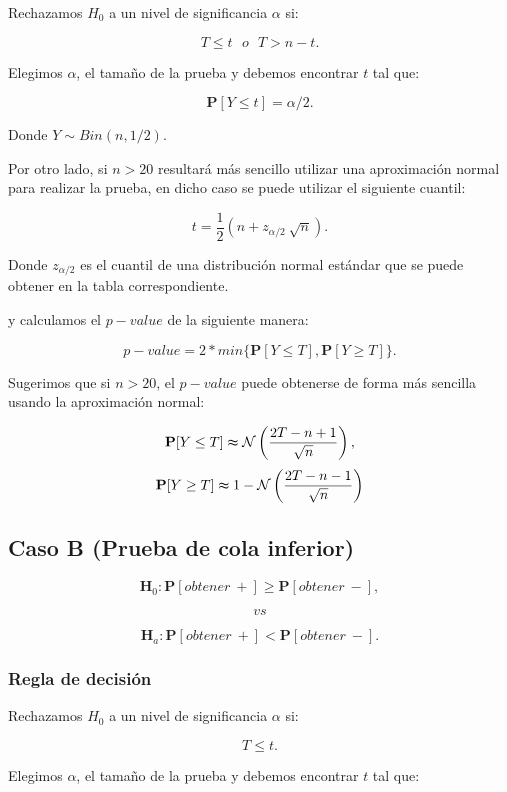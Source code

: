 \documentclass[
  a4paper,
  oneside,
  openany]{book}
\begin{document}
Rechazamos \(H_0\) a un nivel de significancia \(\alpha\) si:

\[T \leq t \ \ \  o \ \ \ T>n-t.\]

Elegimos \(\alpha\), el tamaño de la prueba y debemos encontrar \(t\) tal que:

\[\mathbf{P}[Y \leq t]=\alpha/2.\]

Donde \(Y \sim Bin (n,1/2)\).

Por otro lado, si \(n>20\) resultará más sencillo utilizar una aproximación normal para realizar la prueba, en dicho caso se puede utilizar el siguiente cuantil:

\[t=\frac{1}{2}\left(n+z_{\alpha/2}\ \sqrt{n}\right).\]

Donde \(z_{\alpha/2}\) es el cuantil de una distribución normal estándar que se puede obtener en la tabla correspondiente.

y calculamos el \(p-value\) de la siguiente manera:

\[p-value=2*min\{\mathbf{P}[Y\leq T],\mathbf{P}[Y\geq T]\}.\]

Sugerimos que si \(n > 20\), el \(p-value\) puede obtenerse de forma más sencilla usando la aproximación normal:

\[\mathbf{P}[Y\leq T] \thickapprox  \mathcal{N}\left(\frac{2T-n+1}{\sqrt{n}}\right),\]
\[\mathbf{P}[Y\geq T] \thickapprox 1- \mathcal{N} \left(\frac{2T-n-1}{\sqrt{n}}\right)\]

\hypertarget{caso-b-prueba-de-cola-inferior-2}{%
\subsection*{Caso B (Prueba de cola inferior)}\label{caso-b-prueba-de-cola-inferior-2}}


\[\textbf{H}_0: \mathbf{P}[obtener\ +] \geq \mathbf{P}[obtener\ -],\]

\[vs\]

\[\textbf{H}_a: \mathbf{P}[obtener\ +] < \mathbf{P}[obtener\ -].\]

\hypertarget{regla-de-decisiuxf3n-7}{%
\subsubsection*{Regla de decisión}\label{regla-de-decisiuxf3n-7}}


Rechazamos \(H_0\) a un nivel de significancia \(\alpha\) si:

\[T \leq t.\]

Elegimos \(\alpha\), el tamaño de la prueba y debemos encontrar \(t\) tal que:
\end{document}
